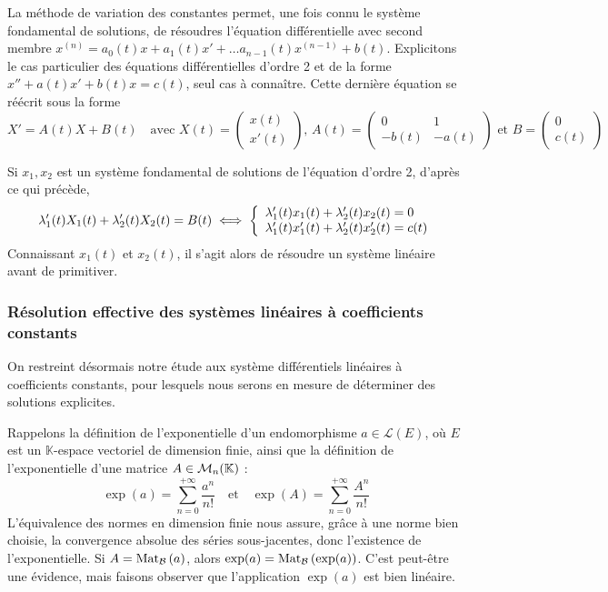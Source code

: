     La méthode de variation des constantes permet, une fois connu le système fondamental de solutions, de résoudres l’équation différentielle avec second membre $x^{(n)} = a_0(t) x + a_1(t) x' + \ldots a_{n-1}(t) x^{(n-1)} + b(t)$. 
    Explicitons le cas particulier des équations différentielles d’ordre 2 et de la forme $x'' + a(t)x' + b(t)x = c(t)$, seul cas à connaître. Cette dernière équation se réécrit sous la forme 
    \[ X' = A(t)X + B(t) \quad \text{avec } X(t) = \begin{pmatrix}
        x(t) \\
        x'(t)
    \end{pmatrix}, \, A(t) = \begin{pmatrix}
        0 & 1 \\
        -b(t) & -a(t)
    \end{pmatrix} \text{ et } B=\begin{pmatrix}
        0 \\
        c(t)
    \end{pmatrix} \]

    Si $x_1,x_2$ est un système fondamental de solutions de l’équation d’ordre 2, d’après ce qui précède, 
    \[ \lambda_1'(t) X_1(t) + \lambda_2'(t) X_2(t) = B(t) \iff \et{\lambda_1'(t)x_1(t) + \lambda_2'(t)x_2(t) = 0}{\lambda_1'(t)x_1'(t) + \lambda_2'(t)x_2'(t) = c(t)} \] 
    Connaissant $x_1(t)$ et $x_2(t)$, il s’agit alors de résoudre un système linéaire avant de primitiver.

    \subsubsection{Résolution effective des systèmes linéaires à coefficients constants}

    On restreint désormais notre étude aux système différentiels linéaires à coefficients constants, pour lesquels nous serons en mesure de déterminer des solutions explicites.

    Rappelons la définition de l’exponentielle d’un endomorphisme $a \in \mathcal{L}(E)$, où $E$ est un $\mathbb{K}$-espace vectoriel de dimension finie, ainsi que la définition de l’exponentielle d’une matrice $A \in \mathcal{M}_{n}(\mathbb{K})$ : 
    \[ \exp(a) = \sum\limits_{n=0}^{+\infty} \frac{a^n}{n!} \quad \text{et} \quad \exp(A) = \sum\limits_{n=0}^{+\infty} \frac{A^n}{n!} \] 
    L’équivalence des normes en dimension finie nous assure, grâce à une norme bien choisie, la convergence absolue des séries sous-jacentes, donc l’existence de l’exponentielle. Si $A = \text{Mat}_{\mathcal{B}}\left(a\right)$, alors $\exp(a) = \text{Mat}_{\mathcal{B}}\left(\exp(a)\right)$. C’est peut-être une évidence, mais faisons observer que l’application $\exp(a)$ est bien linéaire.

